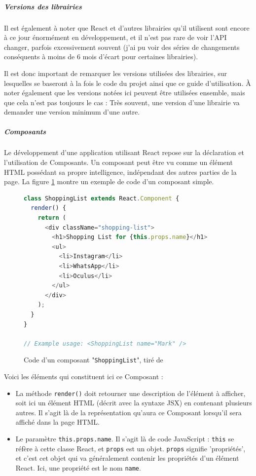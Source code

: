 			\subparagraph{Versions des librairies}

			Il est également à noter que React et d'autres librairies qu'il utilisent sont encore à ce jour énormément en développement, et il n'est pas rare de voir l'API changer, parfois excessivement souvent (j'ai pu voir des séries de changements conséquents à moins de 6 mois d'écart pour certaines librairies).

			Il est donc important de remarquer les versions utilisées des librairies, sur lesquelles se baseront à la fois le code du projet ainsi que ce guide d'utilisation. À noter également que les versions notées ici peuvent être utilisées ensemble, mais que cela n'est pas toujours le cas : Très souvent, une version d'une librairie va demander une version minimum d'une autre.

			\subparagraph{Composants}

			Le développement d'une application utilisant React repose sur la déclaration et l'utilisation de Composants. Un composant peut être vu comme un élément HTML possédant sa propre intelligence, indépendant des autres parties de la page. La figure \ref{analyse_composant_react} montre un exemple de code d'un composant simple.

			\begin{figure}[!h]
				\begin{lstlisting}[language=JavaScript]
class ShoppingList extends React.Component {
  render() {
    return (
      <div className="shopping-list">
        <h1>Shopping List for {this.props.name}</h1>
        <ul>
          <li>Instagram</li>
          <li>WhatsApp</li>
          <li>Oculus</li>
        </ul>
      </div>
    );
  }
}

// Example usage: <ShoppingList name="Mark" /> \end{lstlisting}
				\caption{Code d'un composant "\texttt{ShoppingList}", tiré de \cite{tutorial-react}}
				\label{analyse_composant_react}
			\end{figure}

			Voici les éléments qui constituent ici ce Composant :

			\begin{itemize}
				\item La méthode \texttt{render()} doit retourner une description de l'élément à afficher, soit ici un élément HTML (décrit avec la syntaxe JSX) en contenant plusieurs autres. Il s'agit là de la représentation qu'aura ce Composant lorsqu'il sera affiché dans la page HTML.
				\item Le paramètre \texttt{{this.props.name}}. Il s'agit là de code JavaScript : \texttt{this} se réfère à cette classe React, et \texttt{props} est un objet. \texttt{props} signifie 'propriétés', et c'est cet objet qui va généralement contenir les propriétés d'un élément React. Ici, une propriété est le nom \texttt{name}.
			\end{itemize}

